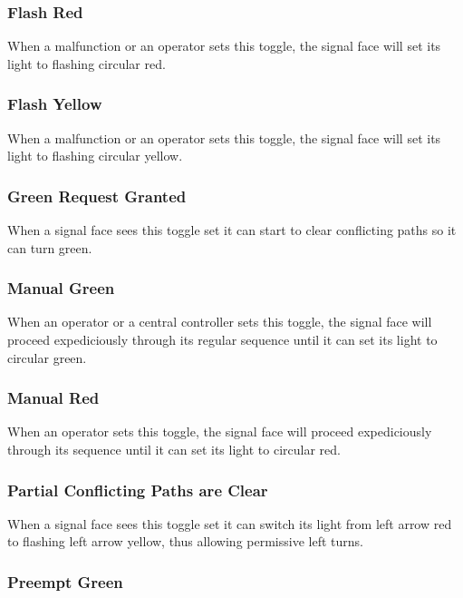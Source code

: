 \documentclass[letterpaper,twoside]{article}
\begin{document}
\subsubsection{Flash Red}

When a malfunction or an operator sets this toggle, the signal face
will set its light to flashing circular red.

\subsubsection{Flash Yellow}

When a malfunction or an operator sets this toggle, the signal face
will set its light to flashing circular yellow.

\subsubsection{Green Request Granted}

When a signal face sees this toggle set it can start to clear conflicting
paths so it can turn green.

\subsubsection{Manual Green}

When an operator or a central controller sets this toggle,
the signal face will proceed
expediciously through its regular sequence until it can set its light to
circular green.

\subsubsection{Manual Red}

When an operator sets this toggle, the signal face will proceed
expediciously through its sequence until it can set its light to
circular red.

\subsubsection{Partial Conflicting Paths are Clear}

When a signal face sees this toggle set it can switch its light
from left arrow red to flashing left arrow yellow, thus allowing
permissive left turns.

\subsubsection{Preempt Green}
\end{document}
